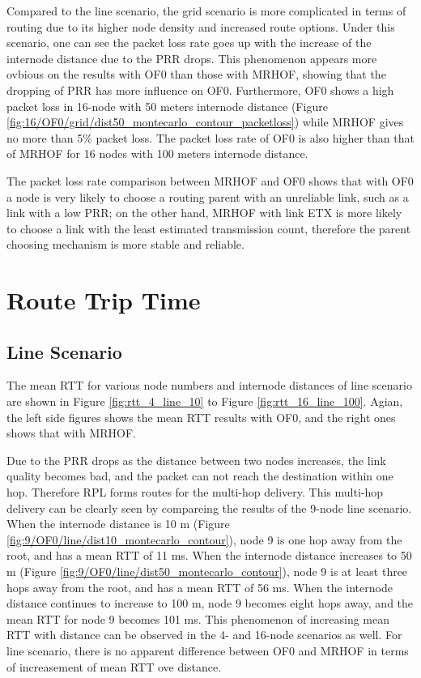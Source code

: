 Compared to the line scenario, the grid scenario is more complicated in terms of routing due to its higher node density and increased route options.  Under this scenario, one can see the packet loss rate goes up with the increase of the internode distance due to the PRR drops. This phenomenon appears more ovbious on the results with OF0 than those with MRHOF, showing that the dropping of PRR has more influence on OF0. Furthermore, OF0 shows a high packet loss in 16-node with 50 meters internode distance (Figure \ref{fig:16/OF0/grid/dist50_montecarlo_contour_packetloss}) while MRHOF gives no more than 5\% packet loss. The packet loss rate of OF0 is also higher than that of MRHOF for 16 nodes with 100 meters internode distance. 
\newline

The packet loss rate comparison between MRHOF and OF0 shows that with OF0 a node is very likely to choose a routing parent with an unreliable link, such as a link with a low PRR; on the other hand, MRHOF with link ETX is more likely to choose a link with the least estimated transmission count, therefore the parent choosing mechanism is more stable and reliable. 

\section{Route Trip Time}
\label{rtt}
 
\subsection{Line Scenario}
\label{line scenario}

The mean RTT for various node numbers and internode distances of line scenario are shown in Figure \ref{fig:rtt_4_line_10} to Figure \ref{fig:rtt_16_line_100}. Agian, the left side figures shows the mean RTT results with OF0, and the right ones shows that with MRHOF.
\newline

Due to the PRR drops as the distance between two nodes increases, the link quality becomes bad, and the packet can not reach the destination within one hop. Therefore RPL forms routes for the multi-hop delivery. This multi-hop delivery can be clearly seen by compareing the results of the 9-node line scenario. When the internode distance is 10 m (Figure \ref{fig:9/OF0/line/dist10_montecarlo_contour}), node 9 is one hop away from the root, and has a mean RTT of 11 ms. When the internode distance increases to 50 m (Figure \ref{fig:9/OF0/line/dist50_montecarlo_contour}), node 9 is at least three hops away from the root, and has a mean RTT of 56 ms. When the internode distance continues to increase to 100 m, node 9 becomes eight hops away, and the mean RTT for node 9 becomes 101 ms. This phenomenon of increasing mean RTT with distance can be observed in the 4- and 16-node scenarios as well. For line scenario, there is no apparent difference between OF0 and MRHOF in terms of increasement of mean RTT ove distance.
\newline

